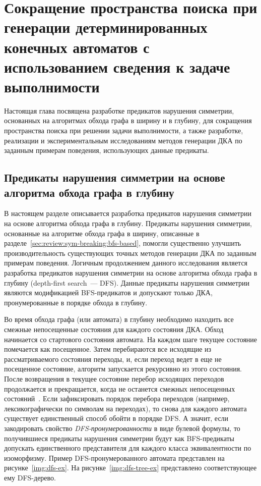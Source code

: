 
\chapter{Сокращение пространства поиска при генерации детерминированных конечных автоматов с использованием сведения к задаче выполнимости}
\label{sec:space}

Настоящая глава посвящена разработке предикатов нарушения симметрии, основанных на алгоритмах обхода графа в ширину и в глубину, для сокращения пространства поиска при решении задачи выполнимости, а также разработке, реализации и экспериментальным исследованиям методов генерации ДКА по заданным примерам поведения, использующих данные предикаты.


\section{Предикаты нарушения симметрии на основе алгоритма обхода графа в глубину}
\label{sec:space:dfs}

В настоящем разделе описывается разработка предикатов нарушения симметрии на основе алгоритма обхода графа в глубину.
Предикаты нарушения симметрии, основанные на алгоритме обхода графа в ширину, описанные в разделе~\ref{sec:review:sym-breaking:bfs-based}, помогли существенно улучшить производительность существующих точных методов генерации ДКА по заданным примерам поведения.
Логичным продолжением данного исследования является разработка предикатов нарушения симметрии на основе алгоритма обхода графа в глубину (depth-first search~--- DFS).
Данные предикаты нарушения симметрии являются модификацией BFS-предикатов и допускают только ДКА, пронумерованные в порядке обхода в глубину.

Во время обхода графа (или автомата) в глубину необходимо находить все смежные непосещенные состояния для каждого состояния ДКА.
Обход начинается со стартового состояния автомата.
На каждом шаге текущее состояние помечается как посещенное.
Затем перебираются все исходящие из рассматриваемого состояния переходы, и, если переход ведет в еще не посещенное состояние, алгоритм запускается рекурсивно из этого состояния.
После возвращения в текущее состояние перебор исходящих переходов продолжается и прекращается, когда не останется смежных непосещенных состояний~\cite{DBLP:books/mg/CormenLRS01}.
Если зафиксировать порядок перебора переходов (например, лексикографически по символам на переходах), то снова для каждого автомата существует единственный способ обойти в порядке DFS.
А значит, если закодировать свойство \emph{DFS-пронумерованности} в виде булевой формулы, то получившиеся предикаты нарушения симметрии будут как BFS-предикаты допускать единственного представителя для каждого класса эквивалентности по изоморфизму.
Пример DFS-пронумерованного автомата представлен на рисунке~\ref{img:dfs-ex}.
На рисунке~\ref{img:dfs-tree-ex} представлено соответствующее ему DFS-дерево.

